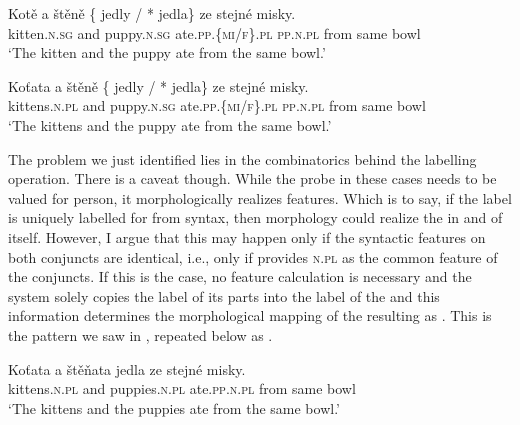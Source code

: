 \documentclass[output=paper,modfontsnewtxmath,hidelinks]{langscibook}
\begin{document}
\ea\gll Kotě a štěně \{\hspace{-2pt} jedly / *\hspace{-2pt} jedla\} ze stejné misky.\label{n-a-rep}\\
kitten.\textsc{n.sg} and puppy.\textsc{n.sg} {} ate.\textsc{pp.\{mi/f\}.pl} {} {} \textsc{pp.n.pl} from same bowl\\
\glt `The kitten and the puppy ate from the same bowl.'\\\hfill{}
\z

\ea\gll Koťata a štěně \{\hspace{-2pt} jedly / *\hspace{-2pt} jedla\} ze stejné misky.\label{n-b-rep}\\
kittens.\textsc{n.pl} and puppy.\textsc{n.sg} {} ate.\textsc{pp.\{mi/f\}.pl} {} {} \textsc{pp.n.pl} from same bowl\\
\glt `The kittens and the puppy ate from the same bowl.'\\\hfill{}
\z

\noindent The problem we just identified lies in the combinatorics behind the labelling operation. There is a caveat though. While the probe in these cases needs to be valued for person, it morphologically realizes  features. Which is to say, if the label is uniquely labelled for  from syntax, then morphology could realize the  in and of itself. However, I argue that this may happen only if the syntactic features on both conjuncts are identical, i.e., only if  provides \textsc{n.pl} as the common feature of the conjuncts. If this is the case, no feature calculation is necessary and the system solely copies the   label of its parts into the label of the  and this information determines the morphological mapping of the resulting  as  . This is the pattern we saw in , repeated below as .

\ea\gll Koťata a štěňata jedla ze stejné misky.\label{n-c-rep}\\
kittens.\textsc{n.pl} and puppies.\textsc{n.pl} ate.\textsc{pp.n.pl} from same bowl\label{n-pl2}\\
\glt `The kittens and the puppies  ate from the same bowl.' \hfill{}
\z
\end{document}
